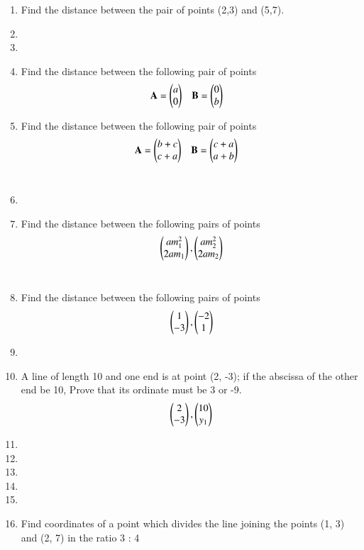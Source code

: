 \renewcommand{\theequation}{\theenumi}
\renewcommand{\thefigure}{\theenumi}
\begin{enumerate}[label=\thesubsection.\arabic*.,ref=\thesubsection.\theenumi]

\item Find the distance between the pair of points (2,3) and (5,7). 
\\
\solution

\item 


\item 
\item 
Find the distance between the following pair of points
\begin{align}
\mathbf{A}&=\begin{pmatrix}a\\0\end{pmatrix} & \mathbf{B}&=\begin{pmatrix}0\\b\end{pmatrix}
\end{align}
\solution
		
\item 
Find the distance between the following pair of points
\begin{align}
\mathbf{A}&=\begin{pmatrix}b+c\\c+a\end{pmatrix} & \mathbf{B}&=\begin{pmatrix}c+a\\a+b\end{pmatrix}
\end{align}
\\
\solution

\item 
\item 
Find the distance between the following pairs of points
\begin{align}
\begin{pmatrix}am_1^2\\2am_1\end{pmatrix}, \begin{pmatrix}am_2^2\\2am_2\end{pmatrix}
\end{align}
\\
\solution
	
\item 
Find the distance between the following pairs of points
\begin{align}
\begin{pmatrix}1\\-3\end{pmatrix}, \begin{pmatrix}-2\\1\end{pmatrix}
\end{align}
\solution
	
\item 
\item 
A line of length 10 and one end is at point (2, -3); if the abscissa of the other end be 10, Prove that its ordinate must be 3 or -9.
\begin{align}
\begin{pmatrix}2\\-3\end{pmatrix}, \begin{pmatrix}10\\y_1\end{pmatrix} \label{1/10/eq:1}
\end{align}
\solution
%	
\item 
\item 
\item 
\item 
\item 
\item 
Find coordinates of a point which divides the line joining the points (1, 3) and (2, 7) in the ratio 3 : 4
\\
\solution
		
 

\end{enumerate}
